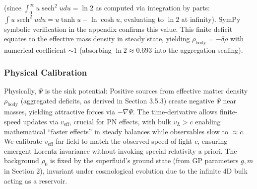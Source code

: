\documentclass{article}
\DeclareMathOperator{\sech}{sech}
\begin{document}
(since $\int_0^\infty u \sech^2 u du = \ln 2$ as computed via integration by parts: $\int u \sech^2 u du = u \tanh u - \ln \cosh u$, evaluating to $\ln 2$ at infinity). SymPy symbolic verification in the appendix confirms this value. This finite deficit equates to the effective mass density in steady state, yielding $\rho_{\text{body}} = - \delta \rho$ with numerical coefficient $\sim 1$ (absorbing $\ln 2 \approx 0.693$ into the aggregation scaling).

\begin{center}
\end{center}

\subsubsection{Physical Calibration}

Physically, $\Psi$ is the sink potential: Positive sources from effective matter density $\rho_{\text{body}}$ (aggregated deficits, as derived in Section 3.5.3) create negative $\Psi$ near masses, yielding attractive forces via $-\nabla \Psi$. The time-derivative allows finite-speed updates via $v_{\text{eff}}$, crucial for PN effects, with bulk $v_L > c$ enabling mathematical ``faster effects'' in steady balances while observables slow to $\approx c$. We calibrate $v_{\text{eff}}$ far-field to match the observed speed of light $c$, ensuring emergent Lorentz invariance without invoking special relativity a priori. The background $\rho_0$ is fixed by the superfluid's ground state (from GP parameters $g, m$ in Section 2), invariant under cosmological evolution due to the infinite 4D bulk acting as a reservoir.
\end{document}
